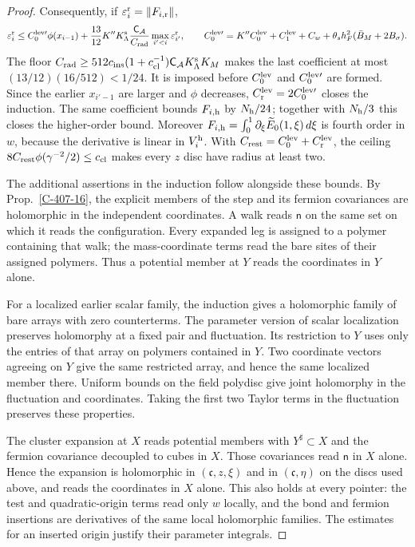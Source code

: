 \documentclass[11pt,letterpaper,reqno]{amsart}
\theoremstyle{definition}
\theoremstyle{remark}
\begin{document}
\begin{proof}
Consequently, if $\varepsilon_i^{\rm r}=\|F_{i,\rm r}\|$,
\[
 \varepsilon_i^{\rm r}\le C_0^{{\rm lev}\prime}\phi(x_{i-1})
       +\frac{13}{12}K''K_\Lambda^{\rm s}
          \frac{\mathsf C_{\mathcal A}}{C_{\rm rad}}
                              \max_{i'<i}\varepsilon_{i'}^{\rm r},
 \qquad
 C_0^{{\rm lev}\prime}=K''C_0^{\rm lev}+C_1^{\rm lev}
                      +C_w+\theta_sh_F^2(\bar B_M+2B_\sigma).
\]
The floor $C_{\rm rad}\ge512c_{\rm ins}(1+c_{\rm cl}^{-1})
\mathsf C_{\mathcal A}K_\Lambda^{\rm s}K_M$ makes the last
coefficient at most $(13/12)(16/512)<1/24$. It is imposed
before $C_0^{\rm lev}$ and $C_0^{{\rm lev}\prime}$ are formed.
Since the earlier $x_{i'-1}$ are larger and $\phi$ decreases,
$C_{\rm r}^{\rm lev}=2C_0^{{\rm lev}\prime}$ closes the
induction. The same coefficient bounds $F_{i,\rm h}$ by
$N_{\rm h}/24$; together with $N_{\rm h}/3$ this closes the
higher-order bound. Moreover
$F_{i,\rm h}=\int_0^1\partial_\xi\widetilde E_0(1,\xi)\,d\xi$
is fourth order in $w$, because the derivative is linear in
$V_i^{\rm h}$. With $C_{\rm rest}=C_0^{\rm lev}+C_{\rm r}^{\rm lev}$,
the ceiling $8C_{\rm rest}\phi(\gamma^{-2}/2)\le c_{\rm cl}$
makes every $z$ disc have radius at least two.

The additional assertions in the induction follow
alongside these bounds. By Prop.~\ref{C-407-16},
the explicit members of the step and its fermion
covariances are holomorphic in the independent
coordinates. A walk reads $\mathsf n$ on the same set
on which it reads the configuration. Every expanded
leg is assigned to a polymer containing that walk;
the mass-coordinate terms read the bare sites of
their assigned polymers. Thus a potential member
at $Y$ reads the coordinates in $Y$ alone.

For a localized earlier scalar family, the induction
gives a holomorphic family of bare arrays with zero
counterterms. The parameter version of scalar
localization preserves holomorphy at a fixed pair
and fluctuation. Its restriction to $Y$ uses only
the entries of that array on polymers contained in
$Y$. Two coordinate vectors agreeing on $Y$ give
the same restricted array, and hence the same
localized member there. Uniform bounds on the
field polydisc give joint holomorphy in the
fluctuation and coordinates. Taking the first two
Taylor terms in the fluctuation preserves these
properties.

The cluster expansion at $X$ reads potential
members with $Y^\sharp\subset X$ and the fermion
covariance decoupled to cubes in $X$. Those
covariances read $\mathsf n$ in $X$ alone. Hence
the expansion is holomorphic in
$(\mathfrak c,z,\xi)$ and in $(\mathfrak c,\eta)$
on the discs used above, and reads the coordinates
in $X$ alone. This also holds at every pointer:
the test and quadratic-origin terms read only
$w$ locally, and the bond and fermion insertions
are derivatives of the same local holomorphic
families. The estimates for an inserted origin
justify their parameter integrals.


\end{proof}
\end{document}
